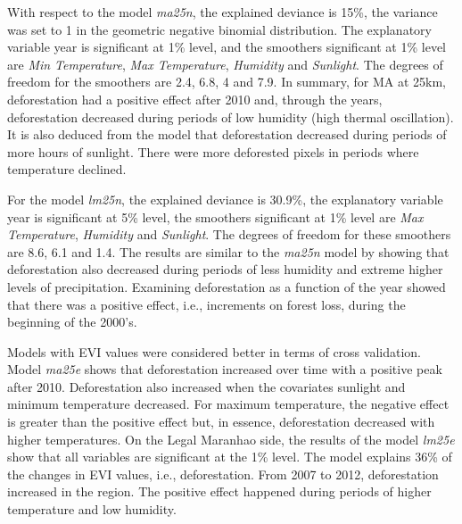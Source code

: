 With respect to the model \textit{ma25n}, the explained deviance is 15\%, the variance was set to 1 in the geometric negative binomial distribution. The explanatory variable year is significant at 1\% level, and the smoothers significant at 1\% level are \textit{Min Temperature}, \textit{Max Temperature}, \textit{Humidity} and \textit{Sunlight}. The degrees of freedom for the smoothers are 2.4, 6.8, 4 and 7.9. In summary, for MA at 25km, deforestation had a positive effect after 2010 and, through the years, deforestation decreased during periods of low humidity (high thermal oscillation). It is also deduced from the model that deforestation decreased during periods of more hours of sunlight. There were more deforested pixels in periods where temperature declined. 

For the model \textit{lm25n}, the explained deviance is 30.9\%, the explanatory variable year is significant at 5\% level, the smoothers significant at 1\% level are \textit{Max Temperature}, \textit{Humidity} and \textit{Sunlight}. The degrees of freedom for these smoothers are 8.6, 6.1 and 1.4. The results are similar to the \textit{ma25n} model by showing that deforestation also decreased during periods of less humidity and extreme higher levels of precipitation. Examining deforestation as a function of the year showed that there was a positive effect, i.e., increments on forest loss, during the beginning of the 2000's.



Models with EVI values were considered better in terms of cross validation. Model \textit{ma25e} shows that deforestation increased over time with a positive peak after 2010. Deforestation also increased when the covariates sunlight and minimum temperature decreased. For maximum temperature, the negative effect is greater than the positive effect but, in essence, deforestation decreased with higher temperatures. On the Legal Maranhao side, the results of the model \textit{lm25e} show that all variables are significant at the 1\% level. The model explains 36\% of the changes in EVI values, i.e., deforestation. From 2007 to 2012, deforestation increased in the region. The positive effect happened during periods of higher temperature and low humidity. 



